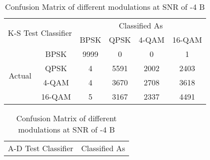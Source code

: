 \documentclass[conference]{IEEEtran}
\begin{document}
\begin{table}[h]
\caption{Confusion Matrix of different modulations at SNR of -4 B}
\centering
\begin{tabular}{|c|c|c|c|c|c|}
\hline
\multicolumn{2}{|c|}{\multirow{2}{*}{K-S Test Classifier}} & \multicolumn{4}{c|}{Classified As}  \\ \cline{3-6}
\multicolumn{2}{|c|}{}                                     & BPSK & QPSK & 4-QAM & 16-QAM \\ \hline
\multirow{4}{*}{Actual}             & BPSK              & 9999 & 0    & 0     & 1      \\ \cline{2-6}
                                       & QPSK              & 4    & 5591 & 2002  & 2403   \\ \cline{2-6}
                                       & 4-QAM             & 4    & 3670 & 2708  & 3618   \\ \cline{2-6}
                                       & 16-QAM            & 5    & 3167 & 2337  & 4491   \\ \hline
\end{tabular}
\vspace{1pt}
\vspace{1pt}
\vspace{1pt}
\vspace{1pt}
\begin{tabular}{|c|c|c|c|c|c|}
\hline
\multicolumn{2}{|c|}{\multirow{2}{*}{A-D Test Classifier}} & \multicolumn{4}{c|}{Classified As}   \\ \cline{3-6}

\end{tabular}
\end{table}
\end{document}
